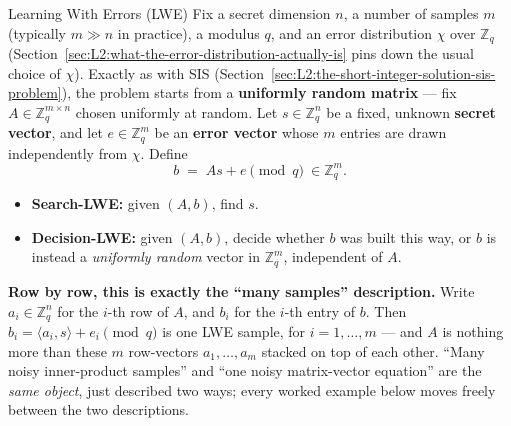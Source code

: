 \begin{defbox}{Learning With Errors (LWE)}
Fix a secret dimension $n$, a number of samples $m$ (typically $m \gg n$ in practice), a modulus $q$, and an error distribution $\chi$ over $\mathbb{Z}_q$ (Section~\ref{sec:L2:what-the-error-distribution-actually-is} pins down the usual choice of $\chi$). Exactly as with SIS (Section~\ref{sec:L2:the-short-integer-solution-sis-problem}), the problem starts from a \textbf{uniformly random matrix} --- fix $A \in \mathbb{Z}_q^{m \times n}$ chosen uniformly at random. Let $s \in \mathbb{Z}_q^n$ be a fixed, unknown \textbf{secret vector}, and let $e \in \mathbb{Z}_q^m$ be an \textbf{error vector} whose $m$ entries are drawn independently from $\chi$. Define
$$
b \;=\; As + e \pmod q \ \in \mathbb{Z}_q^m.
$$
\begin{itemize}[leftmargin=*]
  \item \textbf{Search-LWE:} given $(A, b)$, find $s$.
  \item \textbf{Decision-LWE:} given $(A,b)$, decide whether $b$ was built this way, or $b$ is instead a \emph{uniformly random} vector in $\mathbb{Z}_q^m$, independent of $A$.
\end{itemize}
\textbf{Row by row, this is exactly the ``many samples'' description.} Write $a_i \in \mathbb{Z}_q^n$ for the $i$-th row of $A$, and $b_i$ for the $i$-th entry of $b$. Then $b_i = \langle a_i, s\rangle + e_i \pmod q$ is one LWE sample, for $i=1,\ldots,m$ --- and $A$ is nothing more than these $m$ row-vectors $a_1,\ldots,a_m$ stacked on top of each other. ``Many noisy inner-product samples'' and ``one noisy matrix-vector equation'' are the \emph{same object}, just described two ways; every worked example below moves freely between the two descriptions.
\end{defbox}


